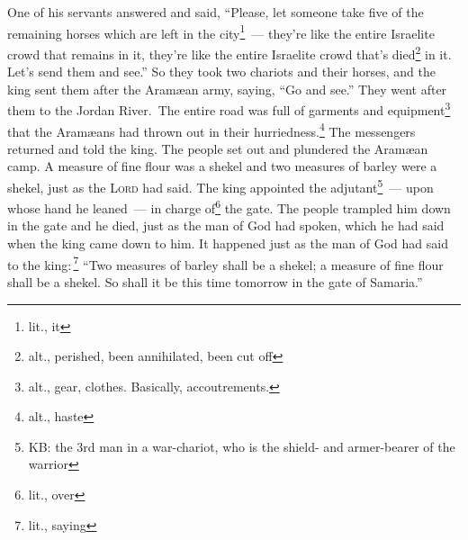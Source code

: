 \begin{inparaenum}
     One of his servants answered and said, ``Please, let someone take five of the remaining horses which are left in the city\understood\footnote{lit., it}~--- they're like the entire Israelite crowd that remains in it, they're like the entire Israelite crowd that's died\footnote{alt., perished, been annihilated, been cut off} in it. Let's send them and see.''%
     So they took two chariots and their horses, and the king sent them after the Aram\ae{}an army, saying, ``Go and see.''%
     They went after them to the Jordan River.\understood\ The entire road was full of garments and equipment\footnote{alt., gear, clothes. Basically, accoutrements.} that the Aram\ae{}ans had thrown out in their hurriedness.\footnote{alt., haste} The messengers returned and told the king.%
     The people set out and plundered the Aram\ae{}an camp. A measure of fine flour was a shekel and two measures of barley were a shekel, just as the \textsc{Lord} had said.%
     The king appointed the adjutant\footnote{KB: the 3rd man in a war-chariot, who is the shield- and armer-bearer of the warrior}~--- upon whose hand he leaned~--- in charge of\footnote{lit., over} the gate. The people trampled him down in the gate and he died, just as the man of God had spoken, which he had said when the king came down to him.%
     It happened just as the man of God had said to the king:\,\footnote{lit., saying} ``Two measures of barley shall be a shekel; a measure of fine flour shall be a shekel. So shall it be this time tomorrow in the gate of Samaria.''%
\end{inparaenum}
